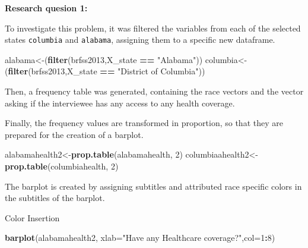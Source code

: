\documentclass[]{article}
\newenvironment{Shaded}{\begin{snugshade}}{\end{snugshade}}
\newcommand{\DataTypeTok}[1]{\textcolor[rgb]{0.13,0.29,0.53}{#1}}
\newcommand{\DecValTok}[1]{\textcolor[rgb]{0.00,0.00,0.81}{#1}}
\newcommand{\KeywordTok}[1]{\textcolor[rgb]{0.13,0.29,0.53}{\textbf{#1}}}
\newcommand{\NormalTok}[1]{#1}
\newcommand{\OperatorTok}[1]{\textcolor[rgb]{0.81,0.36,0.00}{\textbf{#1}}}
\newcommand{\StringTok}[1]{\textcolor[rgb]{0.31,0.60,0.02}{#1}}
\begin{document}
\textbf{Research quesion 1:}

To investigate this problem, it was filtered the variables from each of
the selected states \texttt{columbia} and \texttt{alabama}, assigning
them to a specific new dataframe.

\begin{Shaded}
\begin{Highlighting}[]
\NormalTok{alabama<-(}\KeywordTok{filter}\NormalTok{(brfss2013,X_state }\OperatorTok{==}\StringTok{ "Alabama"}\NormalTok{))}
\NormalTok{columbia<-(}\KeywordTok{filter}\NormalTok{(brfss2013,X_state }\OperatorTok{==}\StringTok{ "District of Columbia"}\NormalTok{))}
\end{Highlighting}
\end{Shaded}

Then, a frequency table was generated, containing the race vectors and
the vector asking if the interviewee has any access to any health
coverage.

\begin{Shaded}
\end{Shaded}

Finally, the frequency values are transformed in proportion, so that
they are prepared for the creation of a barplot.

\begin{Shaded}
\begin{Highlighting}[]
\NormalTok{alabamahealth2<-}\KeywordTok{prop.table}\NormalTok{(alabamahealth, }\DecValTok{2}\NormalTok{) }
\NormalTok{columbiaahealth2<-}\KeywordTok{prop.table}\NormalTok{(columbiahealth, }\DecValTok{2}\NormalTok{)}
\end{Highlighting}
\end{Shaded}

The barplot is created by assigning subtitles and attributed race
specific colors in the subtitles of the barplot.

Color Insertion

\begin{Shaded}
\begin{Highlighting}[]
\KeywordTok{barplot}\NormalTok{(alabamahealth2, }\DataTypeTok{xlab=}\StringTok{"Have any Healthcare coverage?"}\NormalTok{,}\DataTypeTok{col=}\DecValTok{1}\OperatorTok{:}\DecValTok{8}\NormalTok{) }
\end{Highlighting}
\end{Shaded}
\end{document}
